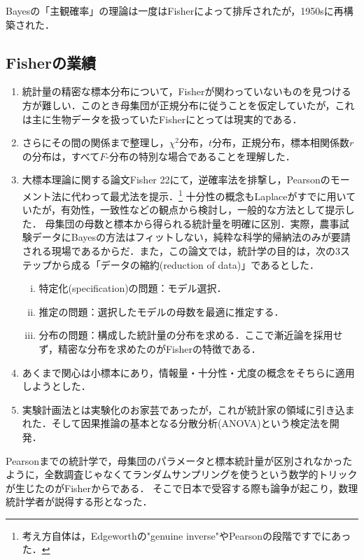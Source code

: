 \documentclass[uplatex,dvipdfmx]{jsreport}
\begin{document}
\begin{discussion}
    Bayesの「主観確率」の理論は一度はFisherによって排斥されたが，1950sに再構築された．
\end{discussion}

\subsection{Fisherの業績}

\begin{enumerate}
    \item 統計量の精密な標本分布について，Fisherが関わっていないものを見つける方が難しい．このとき母集団が正規分布に従うことを仮定していたが，これは主に生物データを扱っていたFisherにとっては現実的である．
    \item さらにその間の関係まで整理し，$\chi^2$分布，$t$分布，正規分布，標本相関係数$r$の分布は，すべて$F$-分布の特別な場合であることを理解した．
    \item 大標本理論に関する論文Fisher 22\cite{Fisher22}にて，逆確率法を排撃し，Pearsonのモーメント法に代わって最尤法を提示．\footnote{考え方自体は，Edgeworthの"genuine inverse"やPearsonの段階ですでにあった．}
    十分性の概念もLaplaceがすでに用いていたが，有効性，一致性などの観点から検討し，一般的な方法として提示した．
    母集団の母数と標本から得られる統計量を明確に区別．実際，農事試験データにBayesの方法はフィットしない，純粋な科学的帰納法のみが要請される現場であるからだ．また，この論文では，統計学の目的は，次の3ステップから成る「データの縮約(reduction of data)」であるとした．
    \begin{enumerate}[(i)]
        \item 特定化(specification)の問題：モデル選択．
        \item 推定の問題：選択したモデルの母数を最適に推定する．
        \item 分布の問題：構成した統計量の分布を求める．ここで漸近論を採用せず，精密な分布を求めたのがFisherの特徴である．
    \end{enumerate}
    \item あくまで関心は小標本にあり，情報量・十分性・尤度の概念をそちらに適用しようとした．
    \item 実験計画法とは実験化のお家芸であったが，これが統計家の領域に引き込まれた．そして因果推論の基本となる分散分析(ANOVA)という検定法を開発．
\end{enumerate}

\begin{history}[日本での受容]
    Pearsonまでの統計学で，母集団のパラメータと標本統計量が区別されなかったように，全数調査じゃなくてランダムサンプリングを使うという数学的トリックが生じたのがFisherからである．
    そこで日本で受容する際も論争が起こり，数理統計学者が説得する形となった．
\end{history}
\end{document}
